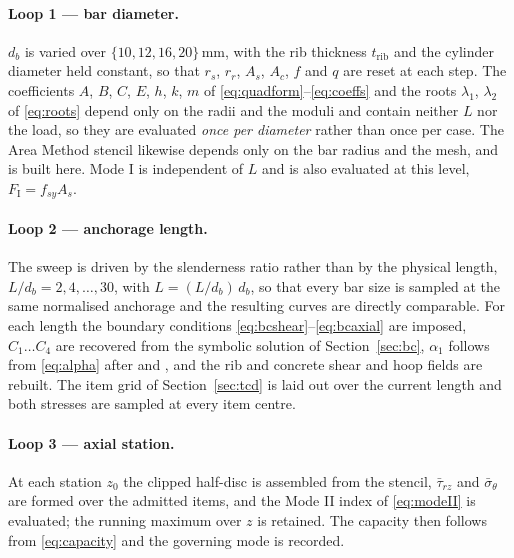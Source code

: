\paragraph{Loop 1 --- bar diameter.}
$d_b$ is varied over $\{10, 12, 16, 20\}$\,mm, with the rib thickness
$t_{\mathrm{rib}}$ and the cylinder diameter held constant, so that $r_s$,
$r_r$, $A_s$, $A_c$, $f$ and $q$ are reset at each step. The coefficients $A$,
$B$, $C$, $E$, $h$, $k$, $m$ of \eqref{eq:quadform}--\eqref{eq:coeffs} and the
roots $\lambda_1$, $\lambda_2$ of \eqref{eq:roots} depend only on the radii
and the moduli and contain neither $L$ nor the load, so they are evaluated
\emph{once per diameter} rather than once per case. The Area Method stencil
\parencite{taylorGeometricalEffectsFatigue1999,taylorTheoryCriticalDistances2010}
likewise depends only on the bar radius and the mesh, and is built here. Mode
I is independent of $L$ and is also evaluated at this level,
$F_{\mathrm{I}} = f_{sy}A_s$.
 
\paragraph{Loop 2 --- anchorage length.}
The sweep is driven by the slenderness ratio rather than by the physical
length, $L/d_b = 2, 4, \dots, 30$, with $L = (L/d_b)\,d_b$, so that every bar
size is sampled at the same normalised anchorage and the resulting curves are
directly comparable. For each length the boundary conditions
\eqref{eq:bcshear}--\eqref{eq:bcaxial} are imposed, $C_1 \dots C_4$ are
recovered from the symbolic solution of Section~\ref{sec:bc}, $\alpha_1$
follows from \eqref{eq:alpha} after
\textcite{nemesModelingCylindricalAdhesively2009} and
\textcite{alaviAnalyticalProcedureFailure2025}, and the rib and concrete shear
and hoop fields are rebuilt. The item grid of Section~\ref{sec:tcd} is laid
out over the current length and both stresses are sampled at every item
centre.
 
\paragraph{Loop 3 --- axial station.}
At each station $z_0$ the clipped half-disc is assembled from the stencil,
$\bar{\tau}_{rz}$ and $\bar{\sigma}_\theta$ are formed over the admitted
items, and the Mode II index of \eqref{eq:modeII} is evaluated; the running
maximum over $z$ is retained. The capacity then follows from
\eqref{eq:capacity} and the governing mode is recorded.
 
